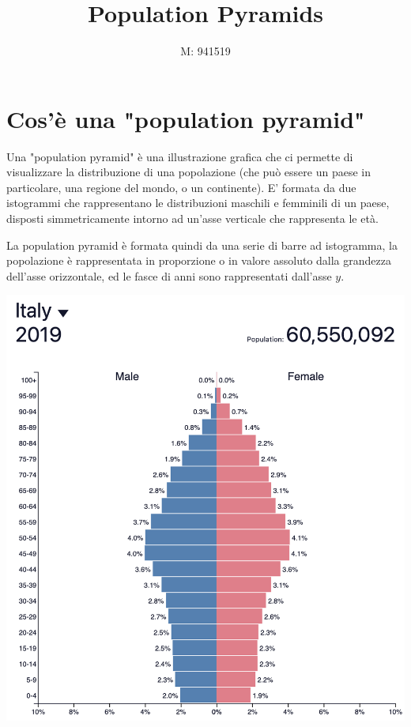 \documentclass[11pt, oneside]{article}   	%
\title{Population Pyramids}
\author{M: 941519}
\begin{document}
\maketitle


\tableofcontents
\pagebreak
\section{Cos'è una "population pyramid"}
Una "population pyramid" è una illustrazione grafica che ci permette di visualizzare la distribuzione di una popolazione (che può essere un paese in particolare, una regione del mondo, o un continente). E' formata da due istogrammi che rappresentano le distribuzioni maschili e femminili di un paese, disposti simmetricamente intorno ad un'asse verticale che rappresenta le età.

La population pyramid è formata quindi da una serie di barre ad istogramma, la popolazione è rappresentata in proporzione o in valore assoluto dalla grandezza dell'asse orizzontale, ed le fasce di anni sono rappresentati dall'asse $y$.


\begin{center}
\includegraphics[scale=0.6]{pop}
\end{center}
\end{document}
